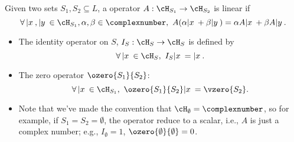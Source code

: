     \begin{definition}
        Given two sets $S_1,S_2\subseteq L$, a operator $A: \cH_{S_1}\rightarrow\cH_{S_2}$ is linear if
        $$\forall\,|x\>,|y\>\in\cH_{S_1}, \alpha,\beta\in\complexnumber,\ A(\alpha|x\>+\beta|y\>) = \alpha A|x\>+\beta A|y\>.$$
        \begin{itemize}
            \item The identity operator on $S$, $I_S:\cH_S\rightarrow\cH_S$ is defined by $$\forall\,|x\>\in\cH_S,\ I_S|x\> = |x\>.$$
            \item The zero operator $\ozero{S_1}{S_2}$: $$\forall\,|x\>\in\cH_{S_1},\ \ozero{S_1}{S_2}|x\> = \vzero{S_2}.$$
            \item Note that we've made the convention that $\cH_\emptyset = \complexnumber$, so for example, if $S_1 = S_2 = \emptyset$, the operator reduce to a scalar, i.e., $A$ is just a complex number; e.g., $I_{\emptyset} = 1$, $\ozero{\emptyset}{\emptyset} = 0$. 
        \end{itemize}
    \end{definition}
    
